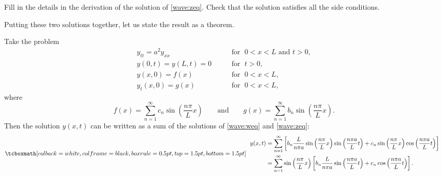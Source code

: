 \begin{exercise}
Fill in the details in the derivation of the solution of \eqref{wave:zeq}.
Check that the solution satisfies all the side conditions.
\end{exercise}

Putting these two solutions together, let us state the result as a theorem.
\begin{theorem}
Take the problem
\begin{equation} \label{wave:tyeq}
\begin{array}{ll}
y_{tt} = a^2 y_{xx} & \qquad \text{for } \; 0 < x < L \text{ and } t > 0,  \\
y(0,t) = y(L,t) = 0 & \qquad \text{for } \; t > 0,  \\
y(x,0) = f(x) & \qquad \text{for } \; 0 < x < L , \\
y_t(x,0) = g(x) & \qquad \text{for } \; 0 < x < L ,
\end{array}
\end{equation}
where
\begin{equation*}
f(x) =
\sum_{n=1}^\infty c_n \sin \left( \frac{n \pi}{L} x \right)
\qquad \text{and} \qquad
g(x) =
\sum_{n=1}^\infty b_n \sin \left( \frac{n \pi}{L} x \right) .
\end{equation*}
Then the solution $y(x,t)$ can be written as a sum of the solutions
of \eqref{wave:weq} and \eqref{wave:zeq}:
\begin{equation*}
\mybxbg{~~
\begin{aligned}
y(x,t)
& =
\sum_{n=1}^\infty
\left[
b_n
\frac{L}{n \pi a}
\sin \left( \frac{n \pi}{L} x \right)
\sin \left( \frac{n \pi a}{L} t \right) 
+
c_n
\sin \left( \frac{n \pi}{L} x \right)
\cos \left( \frac{n \pi a}{L} t \right) 
\right]
\\
& =
\sum_{n=1}^\infty
\sin \left( \frac{n \pi}{L} x \right)
\left[
b_n
\frac{L}{n \pi a}
\sin \left( \frac{n \pi a}{L} t \right) 
+
c_n
\cos \left( \frac{n \pi a}{L} t \right) 
\right] .
\end{aligned}
~~}
\end{equation*}
\end{theorem}

